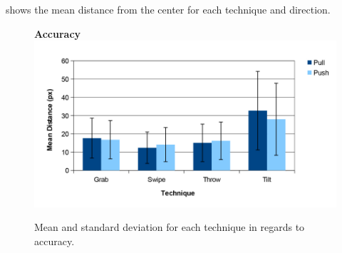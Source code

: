  shows the mean distance from the center for each technique and direction.
\begin{figure}[H]{
	\centering
	\textbf{Accuracy}\\[4pt]
	\includegraphics[width = 1\columnwidth ]{images/distance_graph.pdf}} 
	\caption{
		Mean and standard deviation for each technique in regards to accuracy.
	}
	\label{fig:accuracyGraph}
\end{figure}